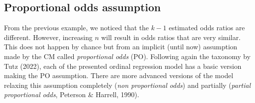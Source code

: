 \documentclass[
  man, mask,floatsintext]{apa6}
\begin{document}
\normalsize

\subsection{Proportional odds assumption}\label{proportional-odds-assumption}

From the previous example, we noticed that the \(k - 1\) estimated odds ratios are different. However, increasing \(n\) will result in odds ratios that are very similar. This does not happen by chance but from an implicit (until now) assumption made by the CM called \emph{proportional odds} (PO). Following again the taxonomy by Tutz (2022), each of the presented ordinal regression model has a basic version making the PO assumption. There are more advanced versions of the model relaxing this assumption completely (\emph{non proportional odds}) and partially (\emph{partial proportional odds}, Peterson \& Harrell, 1990).

\scriptsize
\end{document}
